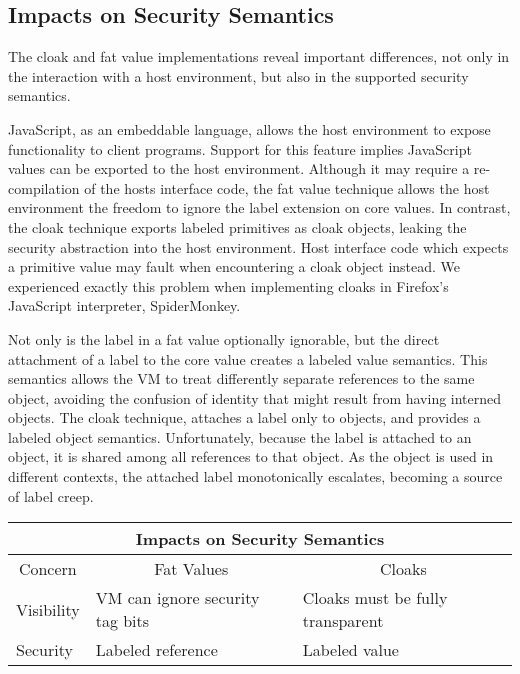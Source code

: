 \documentclass[11pt,onecolumn]{article}
\begin{document}
\subsection{Impacts on Security Semantics}

The cloak and fat value implementations reveal important differences, not only in the interaction with a host environment, but also in the supported security semantics.

JavaScript, as an embeddable language, allows the host environment to expose functionality to client programs.
Support for this feature implies JavaScript values can be exported to the host environment.
Although it may require a re-compilation of the hosts interface code, the fat value technique allows the host environment the freedom to ignore the label extension on core values.
In contrast, the cloak technique exports labeled primitives as cloak objects, leaking the security abstraction into the host environment.
Host interface code which expects a primitive value may fault when encountering a cloak object instead.
We experienced exactly this problem when implementing cloaks in Firefox's JavaScript interpreter, SpiderMonkey.

Not only is the label in a fat value optionally ignorable, but the direct attachment of a label to the core value creates a labeled value semantics.
This semantics allows the VM to treat differently separate references to the same object, avoiding the confusion of identity that might result from having interned objects.
The cloak technique, attaches a label only to objects, and provides a labeled object semantics.
Unfortunately, because the label is attached to an object, it is shared among all references to that object.
As the object is used in different contexts, the attached label monotonically escalates, becoming a source of label creep.

\medskip
\begin{adjustwidth}{-2in}{-2in}
\begin{center}
\begin{tabular}{l|l|l}
\toprule
\multicolumn{3}{c}{Impacts on Security Semantics} \\
\midrule
\multicolumn{1}{c}{Concern} & \multicolumn{1}{|c|}{Fat Values} & \multicolumn{1}{c}{Cloaks} \\
\midrule
Visibility & VM can ignore security tag bits & Cloaks must be fully transparent \\
Security   & Labeled reference & Labeled value \\
\bottomrule
\end{tabular}
\end{center}
\end{adjustwidth}
\medskip
\end{document}
